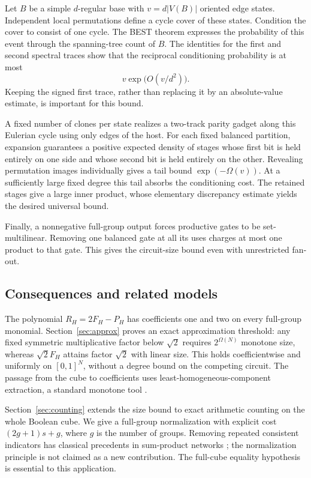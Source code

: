 \documentclass[11pt]{article}
\theoremstyle{definition}
\theoremstyle{remark}
\numberwithin{equation}{section}
\begin{document}
Let \(B\) be a simple \(d\)-regular base with \(v=d|V(B)|\) oriented
edge states. Independent local permutations define a cycle cover of
these states. Condition the cover to consist of one cycle.
The BEST theorem \cite{FarrellLevine2015} expresses the probability
of this event through the spanning-tree count of \(B\). The identities
for the first and second spectral traces show that the reciprocal
conditioning probability is at most
\[
v\exp\bigl(O(v/d^2)\bigr).
\]
Keeping the signed first trace, rather than replacing it by an
absolute-value estimate, is important for this bound.

A fixed number of clones per state realizes a two-track parity gadget
along this Eulerian cycle using only edges of the host. For each fixed
balanced partition, expansion guarantees a positive expected density
of stages whose first bit is held entirely on one side and whose second
bit is held entirely on the other. Revealing permutation images
individually gives a tail bound \(\exp(-\Omega(v))\). At a sufficiently
large fixed degree this tail absorbs the conditioning cost.
The retained stages give a large inner product, whose elementary
discrepancy estimate yields the desired universal bound.

Finally, a nonnegative full-group output forces productive gates
to be set-multilinear. Removing one balanced gate at all its uses
charges at most one product to that gate. This gives the circuit-size
bound even with unrestricted fan-out.

\subsection{Consequences and related models}

The polynomial \(R_H=2F_H-P_H\) has coefficients one and two on every
full-group monomial. Section~\ref{sec:approx} proves an exact
approximation threshold: any fixed symmetric multiplicative factor
below \(\sqrt2\) requires \(2^{\Omega(N)}\) monotone size, whereas
\(\sqrt2 F_H\) attains factor \(\sqrt2\) with linear size.
This holds coefficientwise and uniformly on \([0,1]^N\), without a
degree bound on the competing circuit. The passage from the cube to
coefficients uses least-homogeneous-component extraction, a standard
monotone tool \cite{JerrumSnir1982,Jukna2016}.

Section~\ref{sec:counting} extends the size bound to exact arithmetic
counting on the whole Boolean cube. We give a full-group normalization
with explicit cost \((2g+1)s+g\), where \(g\) is the number of groups.
Removing repeated consistent indicators has classical precedents
in sum-product networks \cite{Peharz2015,MartensMedabalimi2015};
the normalization principle is not claimed as a new contribution.
The full-cube equality hypothesis is essential to this application.
\end{document}
